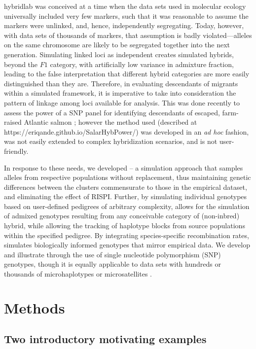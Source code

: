 {\sc hybridlab} was conceived at a time when
the data sets used in molecular ecology universally included very few markers, such that
it was reasonable to assume the markers were unlinked, and, hence, independently segregating.
Today, however, with data sets of thousands of markers, that assumption is badly violated---alleles
on the same chromosome are likely to be segregated together into the next generation.
Simulating linked loci as independent creates simulated hybrids, beyond the $F1$ category, with 
artificially low variance in admixture fraction, leading to the false interpretation that different
hybrid categories are more easily distinguished than they are. Therefore, in evaluating descendants of migrants within a simulated framework, it is imperative to take into consideration the pattern of
linkage among loci available for analysis. This was done recently to assess the power of a SNP panel for identifying descendants of escaped, farm-raised Atlantic salmon \citep{wringe2019development}; however the method used (described at https://eriqande.github.io/SalarHybPower/) was developed in an {\em ad hoc} fashion, was not easily extended to
complex hybridization scenarios, and is not user-friendly.

In response to these needs, we developed \gscramble{} – a simulation approach that samples alleles from respective populations without
replacement, thus maintaining genetic differences between the clusters commensurate to those in the empirical dataset, and eliminating the effect of RISPI.
Further, by simulating individual genotypes based on user-defined pedigrees of arbitrary complexity, \gscramble{} allows for the simulation of admixed genotypes resulting from any conceivable category of (non-inbred) hybrid, while allowing the tracking of haplotype blocks from source populations within the specified pedigree.
By integrating species-specific recombination rates, \gscramble{} simulates biologically informed genotypes that mirror empirical data.
We develop and illustrate \gscramble{} through the use of single nucleotide polymorphism (SNP) genotypes, though it is equally applicable to data sets with hundreds or thousands of
microhaplotypes \citep{baetscher2018microhaplotypes} or microsatellites
\citep{zhan2017megasat}.




\section*{Methods}

\subsection*{Two introductory motivating examples}


